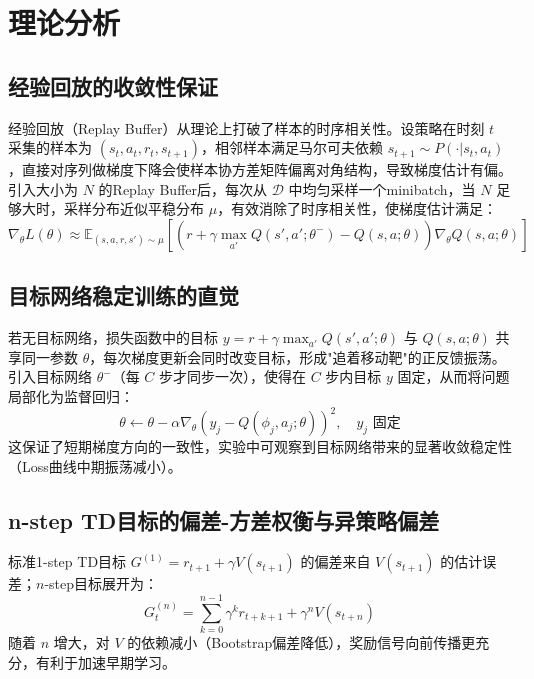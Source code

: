 \documentclass{article}
\begin{document}
\section{理论分析}

\subsection{经验回放的收敛性保证}

经验回放（Replay Buffer）从理论上打破了样本的时序相关性。设策略在时刻 $t$ 采集的样本为 $(s_t, a_t, r_t, s_{t+1})$，相邻样本满足马尔可夫依赖 $s_{t+1} \sim P(\cdot | s_t, a_t)$，直接对序列做梯度下降会使样本协方差矩阵偏离对角结构，导致梯度估计有偏。引入大小为 $N$ 的Replay Buffer后，每次从 $\mathcal{D}$ 中均匀采样一个minibatch，当 $N$ 足够大时，采样分布近似平稳分布 $\mu$，有效消除了时序相关性，使梯度估计满足：
$$\nabla_\theta L(\theta) \approx \mathbb{E}_{(s,a,r,s') \sim \mu}\!\left[\left(r + \gamma \max_{a'} Q(s', a'; \theta^-) - Q(s,a;\theta)\right) \nabla_\theta Q(s,a;\theta)\right]$$

\subsection{目标网络稳定训练的直觉}

若无目标网络，损失函数中的目标 $y = r + \gamma \max_{a'} Q(s', a'; \theta)$ 与 $Q(s,a;\theta)$ 共享同一参数 $\theta$，每次梯度更新会同时改变目标，形成"追着移动靶"的正反馈振荡。引入目标网络 $\theta^-$（每 $C$ 步才同步一次），使得在 $C$ 步内目标 $y$ 固定，从而将问题局部化为监督回归：
$$\theta \leftarrow \theta - \alpha \nabla_\theta \left(y_j - Q(\phi_j, a_j; \theta)\right)^2, \quad y_j \text{ 固定}$$
这保证了短期梯度方向的一致性，实验中可观察到目标网络带来的显著收敛稳定性（Loss曲线中期振荡减小）。

\subsection{n-step TD目标的偏差-方差权衡与异策略偏差}

标准1-step TD目标 $G^{(1)} = r_{t+1} + \gamma V(s_{t+1})$ 的偏差来自 $V(s_{t+1})$ 的估计误差；$n$-step目标展开为：
$$G^{(n)}_t = \sum_{k=0}^{n-1} \gamma^k r_{t+k+1} + \gamma^n V(s_{t+n})$$
随着 $n$ 增大，对 $V$ 的依赖减小（Bootstrap偏差降低），奖励信号向前传播更充分，有利于加速早期学习。
\end{document}
